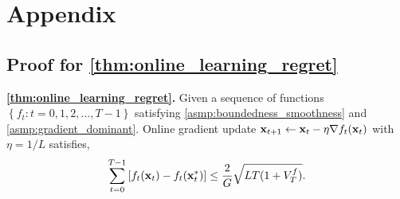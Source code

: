 \section{Appendix}

\subsection{Proof for \cref{thm:online_learning_regret}}

\textbf{\cref{thm:online_learning_regret}.} Given a sequence of functions $\left\{ f_t : t = 0, 1, 2, \dots, T-1 \right\}$ satisfying \cref{asmp:boundedness_smoothness} and \cref{asmp:gradient_dominant}. Online gradient update ${\mathbf{x}}_{t+1} \gets {\mathbf{x}}_{t} - \eta \nabla f_{t}({\mathbf{x}}_{t})$ with $\eta = 1/L$ satisfies,
\begin{equation*}
\begin{split}
    \sum\limits_{t=0}^{T-1}{\left[ f_t({\mathbf{x}}_t) - f_t( {\mathbf{x}}_t^* ) \right]} \le \frac{2}{G} \sqrt{L T ( 1 + V_T^f )}.
\end{split}
\end{equation*}
